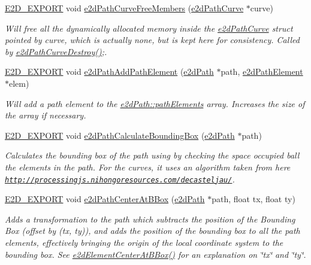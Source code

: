 \begin{DoxyCompactItemize}
\hyperlink{Ez2DS_8h_a9f14e9cb869e1a85fdaba03afcca0df9}{E2\-D\-\_\-\-E\-X\-P\-O\-R\-T} void \hyperlink{group__e2dPath_ga16c606e0d0d346f8aa4ba8dd0d79b08f}{e2d\-Path\-Curve\-Free\-Members} (\hyperlink{structe2dPathCurve}{e2d\-Path\-Curve} $\ast$curve)
\begin{DoxyCompactList}\small\item\em Will free all the dynamically allocated memory inside the \hyperlink{structe2dPathCurve}{e2d\-Path\-Curve} struct pointed by curve, which is actually none, but is kept here for consistency. Called by \hyperlink{group__e2dPath_ga4d40d3c3d9a67d0af8581725f59cf2e4}{e2d\-Path\-Curve\-Destroy()};. \end{DoxyCompactList}\item 
\hyperlink{Ez2DS_8h_a9f14e9cb869e1a85fdaba03afcca0df9}{E2\-D\-\_\-\-E\-X\-P\-O\-R\-T} void \hyperlink{group__e2dPath_ga06c48ed80102a26db2f8d6ae41484eef}{e2d\-Path\-Add\-Path\-Element} (\hyperlink{structe2dPath}{e2d\-Path} $\ast$path, \hyperlink{structe2dPathElement}{e2d\-Path\-Element} $\ast$elem)
\begin{DoxyCompactList}\small\item\em Will add a path element to the \hyperlink{structe2dPath_ac0c8a45ff4f8d02e557fb33887743439}{e2d\-Path\-::path\-Elements} array. Increases the size of the array if necessary. \end{DoxyCompactList}\item 
\hyperlink{Ez2DS_8h_a9f14e9cb869e1a85fdaba03afcca0df9}{E2\-D\-\_\-\-E\-X\-P\-O\-R\-T} void \hyperlink{group__e2dPath_gadb195df30ba2615862bb9f1d1e27a27b}{e2d\-Path\-Calculate\-Bounding\-Box} (\hyperlink{structe2dPath}{e2d\-Path} $\ast$path)
\begin{DoxyCompactList}\small\item\em Calculates the bounding box of the path using by checking the space occupied ball the elements in the path. For the curves, it uses an algorithm taken from here \href{http://processingjs.nihongoresources.com/decasteljau/}{\tt http\-://processingjs.\-nihongoresources.\-com/decasteljau/}. \end{DoxyCompactList}\item 
\hyperlink{Ez2DS_8h_a9f14e9cb869e1a85fdaba03afcca0df9}{E2\-D\-\_\-\-E\-X\-P\-O\-R\-T} void \hyperlink{group__e2dPath_ga352905c23188fdac9caf89018feee20c}{e2d\-Path\-Center\-At\-B\-Box} (\hyperlink{structe2dPath}{e2d\-Path} $\ast$path, float tx, float ty)
\begin{DoxyCompactList}\small\item\em Adds a transformation to the path which subtracts the position of the Bounding Box (offset by (tx, ty)), and adds the position of the bounding box to all the path elements, effectively bringing the origin of the local coordinate system to the bounding box. See \hyperlink{group__e2dElement_gab829b280fa22a3509c40425fc84b5061}{e2d\-Element\-Center\-At\-B\-Box()} for an explanation on \char`\"{}tx\char`\"{} and \char`\"{}ty\char`\"{}. \end{DoxyCompactList}\item 

\end{DoxyCompactItemize}
